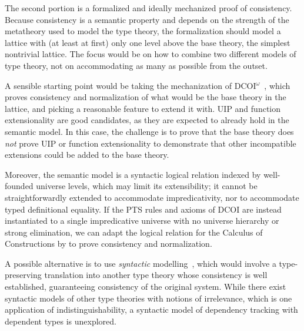 \documentclass{article}
\begin{document}
The second portion is a formalized and ideally mechanized proof of consistency.
Because consistency is a semantic property and depends on the strength
of the metatheory used to model the type theory,
the formalization should model a lattice with (at least at first)
only one level above the base theory, the simplest nontrivial lattice.
The focus would be on how to combine two different models of type theory,
not on accommodating as many as possible from the outset.

A sensible starting point would be taking the mechanization of DCOI$^\omega$~\citep{dcoi-omega},
which proves consistency and normalization of what would be the base theory in the lattice,
and picking a reasonable feature to extend it with.
UIP and function extensionality are good candidates,
as they are expected to already hold in the semantic model.
In this case, the challenge is to prove that the base theory does \emph{not}
prove UIP or function extensionality to demonstrate that
other incompatible extensions could be added to the base theory.

Moreover, the semantic model is a syntactic logical relation
indexed by well-founded universe levels,
which may limit its extensibility;
it cannot be straightforwardly extended to accommodate impredicativity,
nor to accommodate typed definitional equality.
If the PTS rules and axioms of DCOI are instead instantiated to
a single impredicative universe with no universe hierarchy or strong elimination,
we can adapt the logical relation for the Calculus of Constructions by \citet{cc}
to prove consistency and normalization.

A possible alternative is to use \emph{syntactic} modelling~\citep{syntactic},
which would involve a type-preserving translation into another type theory
whose consistency is well established,
guaranteeing consistency of the original system.
While there exist syntactic models of other type theories \citep{sprop,ghosts}
with notions of irrelevance, which is one application of indistinguishability,
a syntactic model of dependency tracking with dependent types is unexplored.

\end{document}
